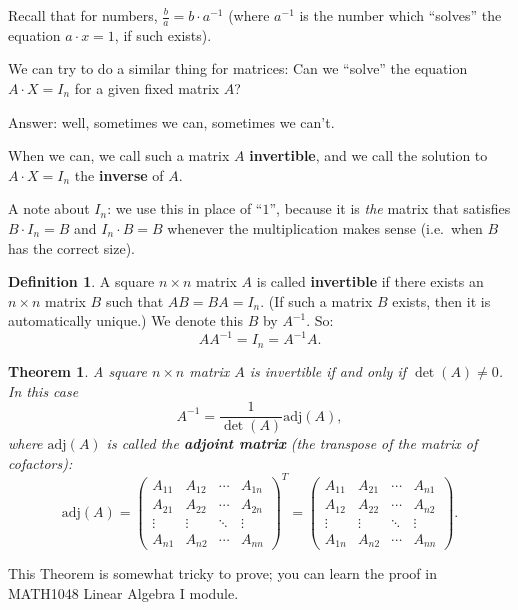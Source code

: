 \documentclass[
  12pt,
  oneside]{book}
\newtheorem{theorem}{Theorem}[chapter]
\theoremstyle{definition}
\newtheorem{definition}{Definition}[chapter]
\theoremstyle{definition}
\theoremstyle{definition}
\theoremstyle{definition}
\theoremstyle{remark}
\begin{document}
Recall that for numbers, \(\frac{b}{a} = b \cdot a^{-1}\) (where \(a^{-1}\) is the number which ``solves'' the equation \(a\cdot x = 1\), if such exists).

We can try to do a similar thing for matrices: Can we ``solve'' the equation \(A\cdot X=I_n\) for a given fixed matrix \(A\)?

Answer: well, sometimes we can, sometimes we can't.

When we can, we call such a matrix \(A\) \textbf{invertible}, and we call the solution to \(A\cdot X=I_n\) the \textbf{inverse} of \(A\).

A note about \(I_n\): we use this in place of ``\(1\)'', because it is \emph{the} matrix that satisfies \(B\cdot I_n=B\) and \(I_n\cdot B=B\) whenever the multiplication makes sense (i.e.~when \(B\) has the correct size).

\begin{definition}
A square \(n\times n\) matrix \(A\) is called \textbf{invertible} if there exists an \(n\times n\) matrix \(B\) such that \(AB=BA=I_n\). (If such a matrix \(B\) exists, then it is automatically unique.) We denote this \(B\) by \(A^{-1}\). So:
\[
AA^{-1}=I_n=A^{-1}A.
\]
\end{definition}

\begin{theorem}
A square \(n\times n\) matrix \(A\) is invertible if and only if \(\det(A)\not=0\). In this case
\[
\boxed{A^{-1} = \frac{1}{\det(A)}\mathrm{adj}(A)},
\]
where \(\mathrm{adj}(A)\) is called the \textbf{adjoint matrix} (the transpose of the matrix of cofactors):
\[
\mathrm{adj}(A) = \begin{pmatrix}
    A_{11} & A_{12} & \cdots & A_{1n}\\
    A_{21} & A_{22} & \cdots & A_{2n}\\
    \vdots & \vdots & \ddots & \vdots\\
    A_{n1} & A_{n2} & \cdots & A_{nn}
\end{pmatrix}^T = \begin{pmatrix}
    A_{11} & A_{21} & \cdots & A_{n1}\\
    A_{12} & A_{22} & \cdots & A_{n2}\\
    \vdots & \vdots & \ddots & \vdots\\
    A_{1n} & A_{n2} & \cdots & A_{nn}
\end{pmatrix}.
\]
\end{theorem}

This Theorem is somewhat tricky to prove; you can learn the proof in MATH1048 Linear Algebra I module.
\end{document}
